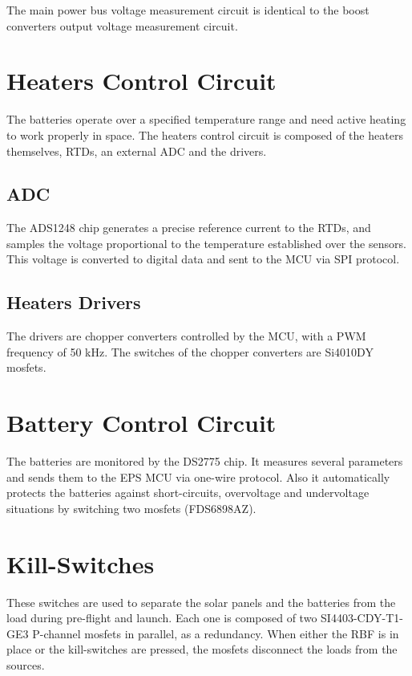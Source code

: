 The main power bus voltage measurement circuit is identical to the boost converters output voltage measurement circuit.

\section{Heaters Control Circuit}

The batteries operate over a specified temperature range and need active heating to work properly in space. The heaters control circuit is composed of the heaters themselves, RTDs, an external ADC and the drivers.

\subsection{ADC}

The ADS1248 chip generates a precise reference current to the RTDs, and samples the voltage proportional to the temperature established over the sensors. This voltage is converted to digital data and sent to the MCU via SPI protocol.

\subsection{Heaters Drivers}

The drivers are chopper converters controlled by the MCU, with a PWM frequency of 50 kHz. The switches of the chopper converters are Si4010DY mosfets.

\section{Battery Control Circuit}

The batteries are monitored by the DS2775 chip. It measures several parameters and sends them to the EPS MCU via one-wire protocol. Also it automatically protects the batteries against short-circuits, overvoltage and undervoltage situations by switching two mosfets (FDS6898AZ).

\section{Kill-Switches}

These switches are used to separate the solar panels and the batteries from the load during pre-flight and launch. Each one is composed of two SI4403-CDY-T1-GE3 P-channel mosfets in parallel, as a redundancy. When either the RBF is in place or the kill-switches are pressed, the mosfets disconnect the loads from the sources.

